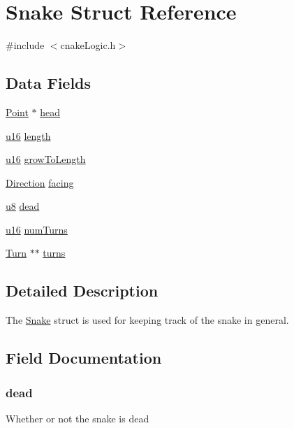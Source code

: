 \hypertarget{struct_snake}{}\section{Snake Struct Reference}
\label{struct_snake}


{\ttfamily \#include $<$cnake\+Logic.\+h$>$}

\subsection*{Data Fields}
\begin{DoxyCompactItemize}
\item 
\hyperlink{struct_point}{Point} $\ast$ \hyperlink{struct_snake_accdccb4805540fdd3b0380f2f3ed5796}{head}
\item 
\hyperlink{my_lib_8h_a9e6c91d77e24643b888dbd1a1a590054}{u16} \hyperlink{struct_snake_a205e2b97fe60d899412ca79655cc064c}{length}
\item 
\hyperlink{my_lib_8h_a9e6c91d77e24643b888dbd1a1a590054}{u16} \hyperlink{struct_snake_ad7b38e6e181a7fc796cdb9dded9878d9}{grow\+To\+Length}
\item 
\hyperlink{cnake_logic_8h_a224b9163917ac32fc95a60d8c1eec3aa}{Direction} \hyperlink{struct_snake_a8353069dfd601a3f9aa2fef0a15cd5fd}{facing}
\item 
\hyperlink{my_lib_8h_aed742c436da53c1080638ce6ef7d13de}{u8} \hyperlink{struct_snake_a2b2f605b873a12656757f595ce3ed659}{dead}
\item 
\hyperlink{my_lib_8h_a9e6c91d77e24643b888dbd1a1a590054}{u16} \hyperlink{struct_snake_a4bff3104a813408b17c1f687e1461f81}{num\+Turns}
\item 
\hyperlink{struct_turn}{Turn} $\ast$$\ast$ \hyperlink{struct_snake_af820fd5b127c523ce57ad98829dfe29f}{turns}
\end{DoxyCompactItemize}


\subsection{Detailed Description}
The \hyperlink{struct_snake}{Snake} struct is used for keeping track of the snake in general. 

\subsection{Field Documentation}
\subsubsection[{\texorpdfstring{dead}{dead}}]{ dead}\hypertarget{struct_snake_a2b2f605b873a12656757f595ce3ed659}{}\label{struct_snake_a2b2f605b873a12656757f595ce3ed659}
Whether or not the snake is dead 
